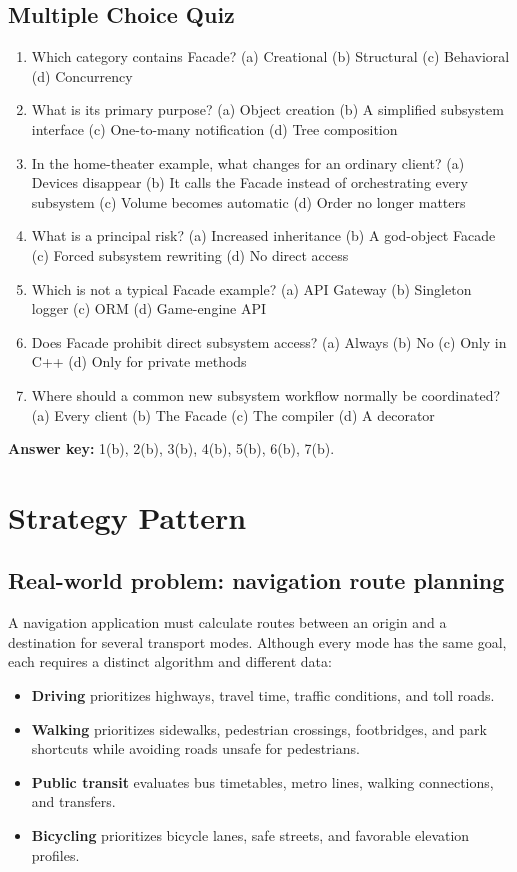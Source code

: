 \documentclass[11pt,a4paper]{report}
\begin{document}
\section{Multiple Choice Quiz}
\begin{enumerate}
  \item Which category contains Facade?\quad
  (a) Creational \quad (b) Structural \quad (c) Behavioral \quad (d) Concurrency
  \item What is its primary purpose?\quad
  (a) Object creation \quad (b) A simplified subsystem interface \quad
  (c) One-to-many notification \quad (d) Tree composition
  \item In the home-theater example, what changes for an ordinary client?\quad
  (a) Devices disappear \quad (b) It calls the Facade instead of orchestrating
  every subsystem \quad (c) Volume becomes automatic \quad (d) Order no longer matters
  \item What is a principal risk?\quad
  (a) Increased inheritance \quad (b) A god-object Facade \quad
  (c) Forced subsystem rewriting \quad (d) No direct access
  \item Which is not a typical Facade example?\quad
  (a) API Gateway \quad (b) Singleton logger \quad (c) ORM \quad (d) Game-engine API
  \item Does Facade prohibit direct subsystem access?\quad
  (a) Always \quad (b) No \quad (c) Only in C++ \quad (d) Only for private methods
  \item Where should a common new subsystem workflow normally be coordinated?\quad
  (a) Every client \quad (b) The Facade \quad (c) The compiler \quad (d) A decorator
\end{enumerate}
\textbf{Answer key:} 1(b), 2(b), 3(b), 4(b), 5(b), 6(b), 7(b).

\chapter{Strategy Pattern}

\section{Real-world problem: navigation route planning}
A navigation application must calculate routes between an origin and a
destination for several transport modes. Although every mode has the same goal,
each requires a distinct algorithm and different data:

\begin{itemize}
  \item \textbf{Driving} prioritizes highways, travel time, traffic conditions,
  and toll roads.
  \item \textbf{Walking} prioritizes sidewalks, pedestrian crossings,
  footbridges, and park shortcuts while avoiding roads unsafe for pedestrians.
  \item \textbf{Public transit} evaluates bus timetables, metro lines, walking
  connections, and transfers.
  \item \textbf{Bicycling} prioritizes bicycle lanes, safe streets, and favorable
  elevation profiles.
\end{itemize}
\end{document}
